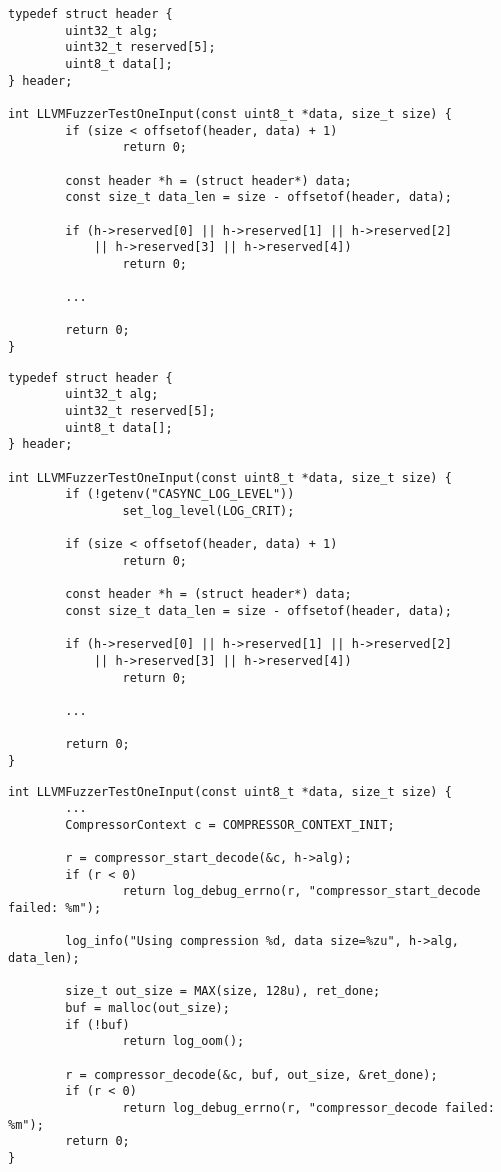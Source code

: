 \documentclass[serif]{beamer}
\begin{document}
\begin{frame}[fragile]
\small
  \begin{verbatim}
typedef struct header {
        uint32_t alg;
        uint32_t reserved[5];
        uint8_t data[];
} header;

int LLVMFuzzerTestOneInput(const uint8_t *data, size_t size) {
        if (size < offsetof(header, data) + 1)
                return 0;

        const header *h = (struct header*) data;
        const size_t data_len = size - offsetof(header, data);

        if (h->reserved[0] || h->reserved[1] || h->reserved[2]
            || h->reserved[3] || h->reserved[4])
                return 0;

        ...

        return 0;
}
\end{verbatim}
\end{frame}

\begin{frame}[fragile]
\small
  \begin{verbatim}
typedef struct header {
        uint32_t alg;
        uint32_t reserved[5];
        uint8_t data[];
} header;

int LLVMFuzzerTestOneInput(const uint8_t *data, size_t size) {
        if (!getenv("CASYNC_LOG_LEVEL"))
                set_log_level(LOG_CRIT);

        if (size < offsetof(header, data) + 1)
                return 0;

        const header *h = (struct header*) data;
        const size_t data_len = size - offsetof(header, data);

        if (h->reserved[0] || h->reserved[1] || h->reserved[2]
            || h->reserved[3] || h->reserved[4])
                return 0;

        ...

        return 0;
}
\end{verbatim}
\end{frame}

\begin{frame}[fragile]
\small
  \begin{verbatim}
int LLVMFuzzerTestOneInput(const uint8_t *data, size_t size) {
        ...
        CompressorContext c = COMPRESSOR_CONTEXT_INIT;

        r = compressor_start_decode(&c, h->alg);
        if (r < 0)
                return log_debug_errno(r, "compressor_start_decode failed: %m");

        log_info("Using compression %d, data size=%zu", h->alg, data_len);

        size_t out_size = MAX(size, 128u), ret_done;
        buf = malloc(out_size);
        if (!buf)
                return log_oom();

        r = compressor_decode(&c, buf, out_size, &ret_done);
        if (r < 0)
                return log_debug_errno(r, "compressor_decode failed: %m");
        return 0;
}
\end{verbatim}
\end{frame}
\end{document}
